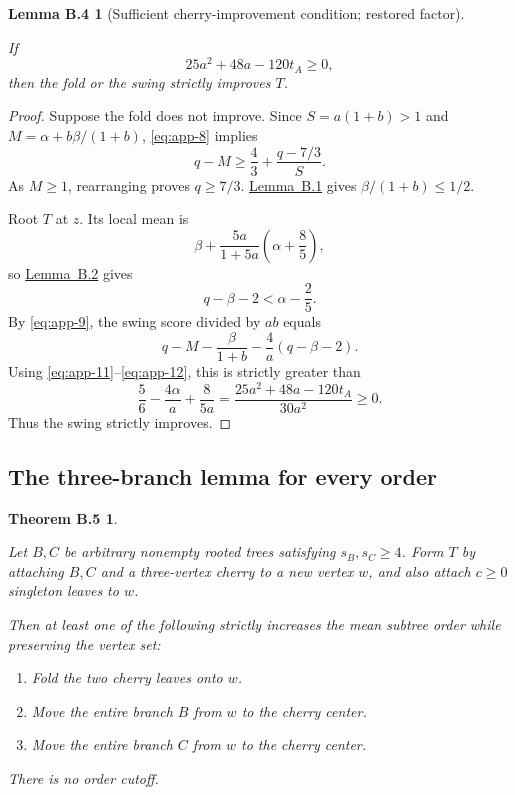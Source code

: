 \documentclass[11pt,reqno]{amsart}
\providecommand{\tightlist}{\setlength{\itemsep}{0.12em}\setlength{\parskip}{0pt}}
\theoremstyle{plain}
\newtheorem*{applemmafour}{Lemma B.4}
\newtheorem*{apptheoremfive}{Theorem B.5}
\begin{document}
\begin{applemmafour}[Sufficient cherry-improvement condition; restored factor]\label{lem:app-4}

If \[
25a^2+48a-120t_A\ge0,
\tag{B.10}\label{eq:app-10}
\] then the fold or the swing strictly improves \(T\).

\end{applemmafour}

\begin{proof} Suppose the fold does not improve. Since \(S=a(1+b)>1\) and \(M=\alpha+b\beta/(1+b)\), \eqref{eq:app-8} implies \[
q-M\ge\frac43+\frac{q-7/3}{S}.
\tag{B.11}\label{eq:app-11}
\] As \(M\ge1\), rearranging proves \(q\ge7/3\). \hyperref[lem:app-1]{Lemma~B.1} gives \(\beta/(1+b)\le1/2\).

Root \(T\) at \(z\). Its local mean is \[
\beta+\frac{5a}{1+5a}\left(\alpha+\frac85\right),
\] so \hyperref[lem:app-2]{Lemma~B.2} gives \[
q-\beta-2<\alpha-\frac25.
\tag{B.12}\label{eq:app-12}
\] By \eqref{eq:app-9}, the swing score divided by \(ab\) equals \[
q-M-\frac{\beta}{1+b}-\frac4a(q-\beta-2).
\] Using \eqref{eq:app-11}--\eqref{eq:app-12}, this is strictly greater than \[
\frac56-\frac{4\alpha}{a}+\frac{8}{5a}
=\frac{25a^2+48a-120t_A}{30a^2}\ge0.
\] Thus the swing strictly improves. \end{proof}

\subsection{The three-branch lemma for every order}\label{b.4.-the-three-branch-lemma-for-every-order}

\begin{apptheoremfive}\label{thm:app-5}

Let \(B,C\) be arbitrary nonempty rooted trees satisfying \(s_B,s_C\ge4\). Form \(T\) by attaching \(B,C\) and a three-vertex cherry to a new vertex \(w\), and also attach \(c\ge0\) singleton leaves to \(w\).

Then at least one of the following strictly increases the mean subtree order while preserving the vertex set:

\begin{enumerate}
\def\labelenumi{\arabic{enumi}.}
\tightlist
\item
  Fold the two cherry leaves onto \(w\).
\item
  Move the entire branch \(B\) from \(w\) to the cherry center.
\item
  Move the entire branch \(C\) from \(w\) to the cherry center.
\end{enumerate}

There is no order cutoff.

\end{apptheoremfive}
\end{document}
